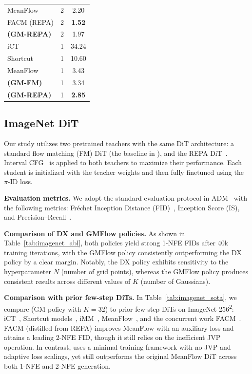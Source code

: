 \begin{table}[t]
\begin{minipage}[t]{0.33\linewidth}
{\begin{tabular}{lcc}
        MeanFlow & 2 & 2.20 \\
        FACM (REPA) & 2 & \textbf{1.52} \\
        \textbf{\methodname{} (GM-REPA)} & 2 & 1.97 \\
        \midrule
        iCT & 1 & 34.24 \\
        Shortcut & 1 & 10.60 \\
        MeanFlow & 1 & 3.43 \\
        \textbf{\methodname{} (GM-FM)} & 1 & 3.34 \\
        \textbf{\methodname{} (GM-REPA)} & 1 & \textbf{2.85} \\
        \bottomrule
        \end{tabular}
    }
\end{minipage}
\end{table}

\subsection{ImageNet DiT}
\label{sec:imagenetexp}

Our study utilizes two pretrained teachers with the same DiT architecture: a standard flow matching (FM) DiT (the baseline in \citet{gmflow}), and the REPA DiT~\citep{yu2025repa}. Interval CFG~\citep{intervalcfg} is applied to both teachers to maximize their performance. Each \methodname{} student is initialized with the teacher weights and then fully finetuned using the $\pi$-ID loss.

\textbf{Evaluation metrics.}
We adopt the standard evaluation protocol in ADM~\citep{dhariwal2021diffusion} with the following metrics: Fréchet Inception Distance (FID)~\citep{FID}, Inception Score (IS), and Precision–Recall~\citep{prmetric}.

\textbf{Comparison of DX and GMFlow policies.}
As shown in Table~\ref{tab:imagenet_abl}, both policies yield strong 1-NFE FIDs after 40k training iterations, with the GMFlow policy 
consistently outperforming the DX policy by a clear margin. Notably, the DX policy exhibits sensitivity to the hyperparameter $N$ (number of grid points), whereas the GMFlow policy produces consistent results across different values of $K$ (number of Gaussians).

\textbf{Comparison with prior few-step DiTs.}
In Table~\ref{tab:imagenet_sota}, we compare \methodname{} (GM policy with $K=32$) to prior few-step DiTs on ImageNet 256\textsuperscript{2}: iCT~\citep{song2024improved}, Shortcut models~\citep{frans2025one}, iMM~\citep{imm}, MeanFlow~\citep{meanflow}, and the concurrent work FACM~\citep{peng2025flowanchoredconsistencymodels}. FACM (distilled from REPA) improves MeanFlow with an auxiliary loss and attains a leading 2-NFE FID, though it still relies on the inefficient JVP operation. In contrast, \methodname{} uses a minimal training framework with no JVP and adaptive loss scalings, yet still outperforms the original MeanFlow DiT across both 1-NFE and 2-NFE generation.

